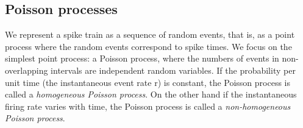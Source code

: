 \subsection{Poisson processes}
We represent a spike train as a sequence of random events, that is, as a point process where the random events correspond to spike times. We focus on the simplest point process: a Poisson process, where the numbers of events in non-overlapping intervals are independent random variables. If the probability per unit time (the instantaneous event rate r) is constant, the Poisson process is 
called a \textit{homogeneous Poisson process}. On the other hand if the instantaneous firing rate varies with time, the Poisson process is called a 
\textit{non-homogeneous Poisson process}.
























































